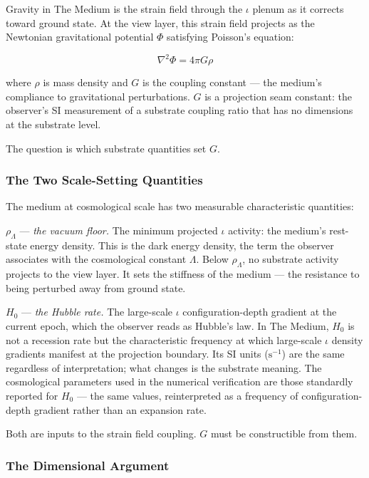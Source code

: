 \documentclass[11pt,letterpaper]{article}
\begin{document}
Gravity in The Medium is the strain field through the \(\iota\) plenum as it corrects toward ground state. At the view layer, this strain field projects as the Newtonian gravitational potential \(\Phi\) satisfying Poisson's equation:

\begin{equation}
\nabla^2 \Phi = 4\pi G \rho
\end{equation}

where \(\rho\) is mass density and \(G\) is the coupling constant --- the medium's compliance to gravitational perturbations. \(G\) is a projection seam constant: the observer's SI measurement of a substrate coupling ratio that has no dimensions at the substrate level.

The question is which substrate quantities set \(G\).

\subsubsection{The Two Scale-Setting Quantities}
\label{sec:org28b4ec8}

The medium at cosmological scale has two measurable characteristic quantities:

\(\rho_\Lambda\) --- \emph{the vacuum floor.} The minimum projected \(\iota\) activity: the medium's rest-state energy density. This is the dark energy density, the term the observer associates with the cosmological constant \(\Lambda\). Below \(\rho_\Lambda\), no substrate activity projects to the view layer. It sets the stiffness of the medium --- the resistance to being perturbed away from ground state.

\(H_0\) --- \emph{the Hubble rate.} The large-scale \(\iota\) configuration-depth gradient at the current epoch, which the observer reads as Hubble's law. In The Medium, \(H_0\) is not a recession rate but the characteristic frequency at which large-scale \(\iota\) density gradients manifest at the projection boundary. Its SI units (\(\mathrm{s^{-1}}\)) are the same regardless of interpretation; what changes is the substrate meaning. The cosmological parameters used in the numerical verification are those standardly reported for \(H_0\) --- the same values, reinterpreted as a frequency of configuration-depth gradient rather than an expansion rate.

Both are inputs to the strain field coupling. \(G\) must be constructible from them.

\subsubsection{The Dimensional Argument}
\label{sec:org313781c}
\end{document}
